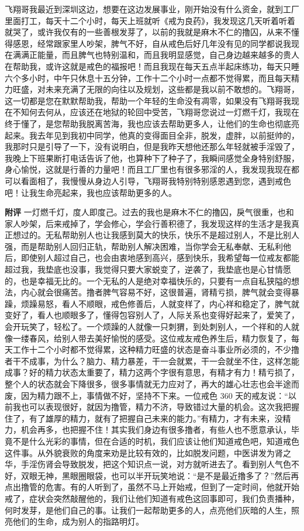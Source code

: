 \begin{case}
    飞翔哥我最近到深圳这边，想要在这边发展事业，刚开始没有什么资金，就到工厂里面打工，每天十二个小时，每天上班就听《戒为良药》，我发现这几天听着听着就哭了，或许我仅有的一些善根发芽了，以前的我就是麻木不仁的撸囚，从来不懂得感恩，经常跟家里人吵架，脾气不好，自从戒色后好几年没有见的同学都说我现在满满正能量，而且脾气也特别温和，而且我明显感觉，自己身边越来越多的贵人在帮助我，或许这就是戒色的福报吧！而且我现在每天五点半起床练功，每天只睡六个多小时，中午只休息十五分钟，工作十二个小时一点都不觉得累，而且每天精力旺盛，对未来充满了无限的向往以及规划，这些都是我以前不敢想的。飞翔哥，这一切都是您在默默帮助我，帮助一个年轻的生命没有凋零，如果没有飞翔哥我现在不知何去何从，应该还在地狱的轮回中受苦，飞翔哥您说过一灯燃千灯，我现在终于懂了，是您帮助我脱离苦海，我也应该去帮助更多人，让他们的生命也彻底亮起来。我去年见到我初中同学，他真的变得面目全非，脱发，虚胖，以前挺帅的，我那时只是引导了一下，没有说明白，但是我昨天想他还那么年轻就被手淫毁了，我晚上下班果断打电话告诉了他，也算种下了种子了，我瞬间感觉全身特别舒服，身心愉悦，这就是行善的力量吧！而且工厂里也有很多邪淫的人，我发现我现在都可以看面相了，我慢慢从身边人引导，飞翔哥我特别特别感恩遇到您，遇到戒色吧！让我生命亮起来，我也应该帮助更多的人。

    \textbf{附评} 一灯燃千灯，度人即度己。过去的我也是麻木不仁的撸囚，戾气很重，也和家人吵架，后来戒掉了，学会修心，学会行善积德了，我发现这样的生活才是我真正想过的。无私帮助别人也让我感到莫大的快乐，快乐不是超过别人，不是比别人强，而是帮助别人回归正轨，帮助别人解决困难，当你学会无私奉献、无私利他后，即使别人超过自己，也会由衷地感到高兴，感到快乐，我希望每一位戒友都能超过我，我垫底也没事，我觉得只要大家蜕变了，逆袭了，我垫底也是心甘情愿的，也是幸福无比的。一个无私的人是绝对幸福快乐的，只要有一点自私狭隘的想法，内心就会很痛苦。撸者脾气容易不好，这很普遍，肾精亏损，脾气就会变得暴躁，烦躁易怒，看人不顺眼，戒色修善后，人就变样了，内心祥和稳定了，脾气就变好了，看人也顺眼多了，懂得包容别人了，人际关系也变得好起来了，爱笑了，会开玩笑了，轻松了。一个烦躁的人就像一只刺猬，到处刺别人，一个祥和的人就像一缕春风，给别人带去美好愉悦的感受。这位戒友戒色养生后，精力恢复了，每天工作十二个小时都不觉得累，这种精力旺盛的状态是奋斗事业所必须的，不少撸者干不成事，为什么？脑力、精力暴差，干一会就累，干一会就坐不住，这样怎能成事？好的精力状态太重要了，精力这两个字很有意思，有精才有力！精亏损了，整个人的状态就会下降很多，很多事情就无力应对了，再大的雄心壮志也会半途而废，因为精力跟不上，事情做不好，坚持不下来。一位戒色 360 天的戒友说：“以前我也可以表现很好，就因为撸管，精力不济，导致错过大量的机会。这次我把握住了，有了雄厚的精力，就有了把握自己未来的能力。”有精力，才有未来，没精力，机会再多，也把握不住！其实我们身边有很多撸者，有些人也不愿意承认，毕竟不是什么光彩的事情，但在合适的时机，我们应该让他们知道戒色吧，知道戒色这件事。从外貌衰败的角度来劝是比较有效的，比如脱发问题，中医讲发为肾之华，手淫伤肾会导致脱发，把这个知识点一说，对方就听进去了。看到别人气色不好，双眼无神，黑眼圈眼袋，也可以半开玩笑地说：“是不是最近撸多了？”然后再点出撸管的危害。有的人听到了，虽然不马上开始戒，但到了一定时间，他就开始戒了，症状会突然敲醒他的，我们让他们知道有戒色这回事即可，我们负责播种，何时发芽，是他们自己的事。让我们一起帮助更多的人，点亮他们灰暗的人生，照亮他们的生命，成为别人的指路明灯。
\end{case}

